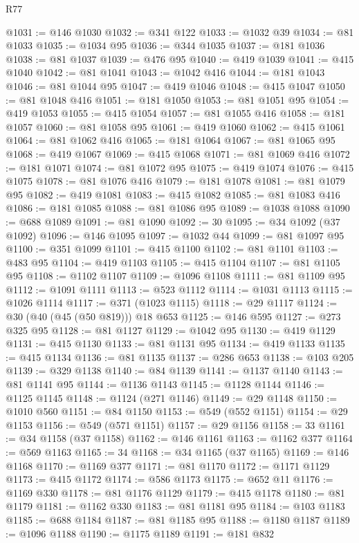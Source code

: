 \begin{lexlean}{R77}
\begin{coremodule}
@1031 := @146 @1030
@1032 := @341 @122
@1033 := @1032 @39
@1034 := @81 @1033
@1035 := @1034 @95
@1036 := @344 @1035
@1037 := @181 @1036
@1038 := @81 @1037
@1039 := @476 @95
@1040 := @419 @1039
@1041 := @415 @1040
@1042 := @81 @1041
@1043 := @1042 @416
@1044 := @181 @1043
@1046 := @81 @1044 @95
@1047 := @419 @1046
@1048 := @415 @1047
@1050 := @81 @1048 @416
@1051 := @181 @1050
@1053 := @81 @1051 @95
@1054 := @419 @1053
@1055 := @415 @1054
@1057 := @81 @1055 @416
@1058 := @181 @1057
@1060 := @81 @1058 @95
@1061 := @419 @1060
@1062 := @415 @1061
@1064 := @81 @1062 @416
@1065 := @181 @1064
@1067 := @81 @1065 @95
@1068 := @419 @1067
@1069 := @415 @1068
@1071 := @81 @1069 @416
@1072 := @181 @1071
@1074 := @81 @1072 @95
@1075 := @419 @1074
@1076 := @415 @1075
@1078 := @81 @1076 @416
@1079 := @181 @1078
@1081 := @81 @1079 @95
@1082 := @419 @1081
@1083 := @415 @1082
@1085 := @81 @1083 @416
@1086 := @181 @1085
@1088 := @81 @1086 @95
@1089 := @1038 @1088
@1090 := @688 @1089
@1091 := @81 @1090
@1092 := 30
@1095 := @34 @1092 (@37 @1092)
@1096 := @146 @1095
@1097 := @1032 @44
@1099 := @81 @1097 @95
@1100 := @351 @1099
@1101 := @415 @1100
@1102 := @81 @1101
@1103 := @483 @95
@1104 := @419 @1103
@1105 := @415 @1104
@1107 := @81 @1105 @95
@1108 := @1102 @1107
@1109 := @1096 @1108
@1111 := @81 @1109 @95
@1112 := @1091 @1111
@1113 := @523 @1112
@1114 := @1031 @1113
@1115 := @1026 @1114
@1117 := @371 (@1023 @1115)
@1118 := @29 @1117
@1124 := @30 (@40 (@45 (@50 @819))) @18 @653
@1125 := @146 @595
@1127 := @273 @325 @95
@1128 := @81 @1127
@1129 := @1042 @95
@1130 := @419 @1129
@1131 := @415 @1130
@1133 := @81 @1131 @95
@1134 := @419 @1133
@1135 := @415 @1134
@1136 := @81 @1135
@1137 := @286 @653
@1138 := @103 @205
@1139 := @329 @1138
@1140 := @84 @1139
@1141 := @1137 @1140
@1143 := @81 @1141 @95
@1144 := @1136 @1143
@1145 := @1128 @1144
@1146 := @1125 @1145
@1148 := @1124 (@271 @1146)
@1149 := @29 @1148
@1150 := @1010 @560
@1151 := @84 @1150
@1153 := @549 (@552 @1151)
@1154 := @29 @1153
@1156 := @549 (@571 @1151)
@1157 := @29 @1156
@1158 := 33
@1161 := @34 @1158 (@37 @1158)
@1162 := @146 @1161
@1163 := @1162 @377
@1164 := @569 @1163
@1165 := 34
@1168 := @34 @1165 (@37 @1165)
@1169 := @146 @1168
@1170 := @1169 @377
@1171 := @81 @1170
@1172 := @1171 @1129
@1173 := @415 @1172
@1174 := @586 @1173
@1175 := @652 @11
@1176 := @1169 @330
@1178 := @81 @1176 @1129
@1179 := @415 @1178
@1180 := @81 @1179
@1181 := @1162 @330
@1183 := @81 @1181 @95
@1184 := @103 @1183
@1185 := @688 @1184
@1187 := @81 @1185 @95
@1188 := @1180 @1187
@1189 := @1096 @1188
@1190 := @1175 @1189
@1191 := @181 @832

\end{coremodule}
\end{lexlean}

